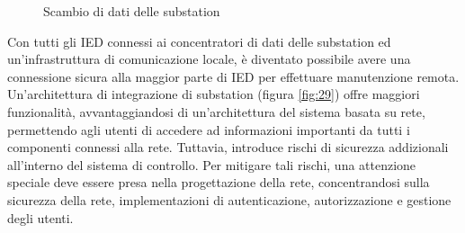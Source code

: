 \begin{figure}[h] 
\caption{Scambio di dati delle substation}\label{fig:28}
\end{figure}

Con tutti gli IED connessi ai concentratori di dati delle substation ed un'infrastruttura di comunicazione locale, è diventato possibile avere una connessione  sicura alla maggior parte di IED per effettuare manutenzione remota.
\newline 
Un'architettura di integrazione di substation (figura \ref{fig:29}) offre maggiori funzionalità, avvantaggiandosi di un'architettura del sistema basata su rete, permettendo agli utenti di accedere ad informazioni importanti da tutti i componenti connessi alla rete. Tuttavia, introduce rischi di sicurezza addizionali all'interno del sistema di controllo. Per mitigare tali rischi, una attenzione speciale deve essere presa nella progettazione della rete, concentrandosi sulla sicurezza della rete, implementazioni di autenticazione, autorizzazione e gestione degli utenti. 
 
